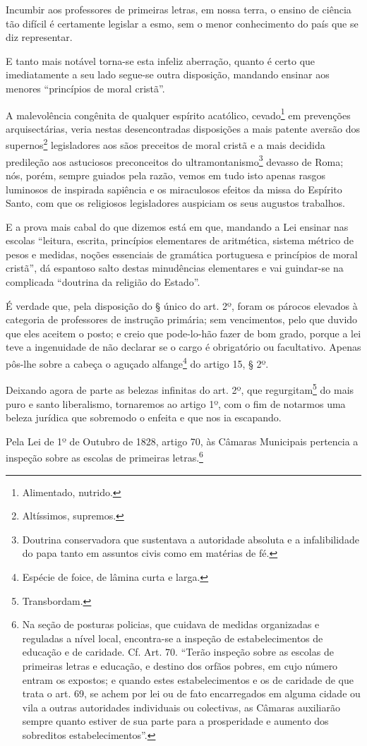 Incumbir aos professores de primeiras letras, em nossa terra, o ensino
de ciência tão difícil é certamente legislar a esmo, sem o menor
conhecimento do país que se diz representar.

E tanto mais notável torna-se esta infeliz aberração, quanto é certo que
imediatamente a seu lado segue-se outra disposição, mandando ensinar aos
menores ``princípios de moral cristã''.

A malevolência congênita de qualquer espírito acatólico,
cevado\footnote{Alimentado, nutrido.} em prevenções arquisectárias,
veria nestas desencontradas disposições a mais patente aversão dos
supernos\footnote{Altíssimos, supremos.} legisladores aos sãos
preceitos de moral cristã e a mais decidida predileção aos astuciosos
preconceitos do ultramontanismo\footnote{Doutrina conservadora que
  sustentava a autoridade absoluta e a infalibilidade do papa tanto em
  assuntos civis como em matérias de fé.} devasso de Roma; nós, porém,
sempre guiados pela razão, vemos em tudo isto apenas rasgos luminosos de
inspirada sapiência e os miraculosos efeitos da missa do Espírito Santo,
com que os religiosos legisladores auspiciam os seus augustos trabalhos.

E a prova mais cabal do que dizemos está em que, mandando a Lei ensinar
nas escolas ``leitura, escrita, princípios elementares de aritmética,
sistema métrico de pesos e medidas, noções essenciais de gramática
portuguesa e princípios de moral cristã'', dá espantoso salto destas
minudências elementares e vai guindar-se na complicada ``doutrina da
religião do Estado''.

É verdade que, pela disposição do § único do art. 2º, foram os párocos
elevados à categoria de professores de instrução primária; sem
vencimentos, pelo que duvido que eles aceitem o posto; e creio que
pode-lo-hão fazer de bom grado, porque a lei teve a ingenuidade de não
declarar se o cargo é obrigatório ou facultativo. Apenas pôs-lhe sobre a
cabeça o aguçado alfange\footnote{Espécie de foice, de lâmina curta e
  larga.} do artigo 15, § 2º.

Deixando agora de parte as belezas infinitas do art. 2º, que
regurgitam\footnote{Transbordam.} do mais puro e santo liberalismo,
tornaremos ao artigo 1º, com o fim de notarmos uma beleza jurídica que
sobremodo o enfeita e que nos ia escapando.

Pela Lei de 1º de Outubro de 1828, artigo 70, às Câmaras Municipais
pertencia a inspeção sobre as escolas de primeiras letras.\footnote{Na
  seção de posturas policias, que cuidava de medidas organizadas e
  reguladas a nível local, encontra-se a inspeção de estabelecimentos de
  educação e de caridade. Cf. Art. 70. ``Terão inspeção sobre as escolas
  de primeiras letras e educação, e destino dos orfãos pobres, em cujo
  número entram os expostos; e quando estes estabelecimentos e os de
  caridade de que trata o art. 69, se achem por lei ou de fato
  encarregados em alguma cidade ou vila a outras autoridades individuais
  ou colectivas, as Câmaras auxiliarão sempre quanto estiver de sua
  parte para a prosperidade e aumento dos sobreditos estabelecimentos''.}

